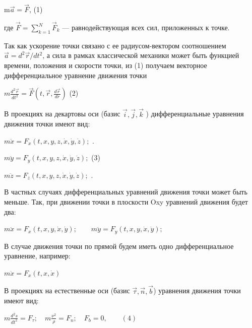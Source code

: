 {\begin{center}
    \par m$\vec{a}=\vec{F}$, \qquad (1)
    
    \par где $\vec{F}=\sum_{k=1}^{N}\vec{F}_{k}$ — равнодействующая всех сил, приложенных к точке.
    
    \par Так как ускорение точки связано с ее радиусом-вектором соотношением $\vec{a}=d^{2}\vec{r}/d t^{2}$, а сила в рамках классической механики может быть функцией времени, положения и скорости точки, из (1) получаем векторное дифференциальное уравнение движения точки
    
    \par $m \frac{d^{2}\vec{r}}{d t^{2}} = \vec{F} \left(t, \vec{r},\frac{d\vec{r}}{dr} \right)$ \qquad (2)
    
    \par В проекциях на декартовы оси (базис $\vec{i}, \vec{j}, \vec{k}$ ) дифференциальные уравнения движения точки имеют вид:

    \par $m \ddot x = F_{x}(t, x, y, z, \dot x, \dot y, \dot z);$
    \qquad .
    \par $m \ddot y = F_{y}(t, x, y, z, \dot x, \dot y, \dot z);$
    \qquad (3)
    \par $m \ddot z = F_{z}(t, x, y, z, \dot x, \dot y, \dot z);$
    \qquad .
    
    \par В частных случаях дифференциальных уравнений движения точки может быть меньше. Так, при движении точки в плоскости Oxy уравнений движения будет два:

    \par $m \ddot x = F_{x}(t, x, y, \dot x, \dot y); \qquad m \ddot y = F_{y}(t, x, y, \dot x, \dot y);$

    \par В  случае движения точки  по  прямой  будем  иметь  одно  дифференциальное уравнение, например:

    \par $m \ddot x = F_{x}(t, x, \dot x)$

    \par В проекциях на естественные оси (базис $\vec{\tau}, \vec{n}, \vec{b}$) уравнения движения точки имеют вид:

    \par $m \frac{d^{2}s}{d t^{2}} = F_{\tau}; \quad m \frac{\nu^{2}}{\rho} = F_{n}; \quad F_{b} = 0, \qquad (4)$ 


\end{center}}
